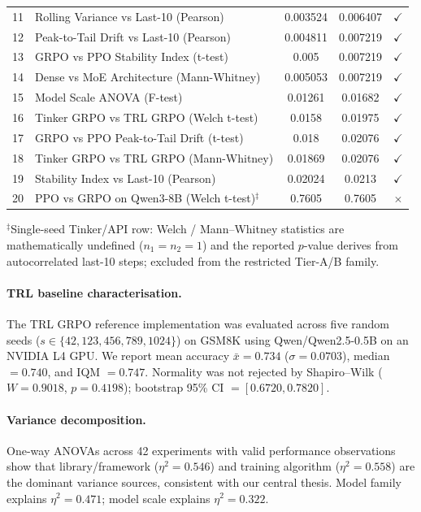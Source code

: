 \documentclass{article}
\begin{document}
\begin{table}[!ht]
\begin{tabular}{@{}rp{6.2cm}ccc@{}}
        11 & Rolling Variance vs Last-10 (Pearson) & 0.003524 & 0.006407 & $\checkmark$ \\
        12 & Peak-to-Tail Drift vs Last-10 (Pearson) & 0.004811 & 0.007219 & $\checkmark$ \\
        13 & GRPO vs PPO Stability Index (t-test) & 0.005 & 0.007219 & $\checkmark$ \\
        14 & Dense vs MoE Architecture (Mann-Whitney) & 0.005053 & 0.007219 & $\checkmark$ \\
        15 & Model Scale ANOVA (F-test) & 0.01261 & 0.01682 & $\checkmark$ \\
        16 & Tinker GRPO vs TRL GRPO (Welch t-test) & 0.0158 & 0.01975 & $\checkmark$ \\
        17 & GRPO vs PPO Peak-to-Tail Drift (t-test) & 0.018 & 0.02076 & $\checkmark$ \\
        18 & Tinker GRPO vs TRL GRPO (Mann-Whitney) & 0.01869 & 0.02076 & $\checkmark$ \\
        19 & Stability Index vs Last-10 (Pearson) & 0.02024 & 0.0213 & $\checkmark$ \\
        20 & PPO vs GRPO on Qwen3-8B (Welch t-test)$^{\ddag}$ & 0.7605 & 0.7605 & $\times$ \\
\bottomrule
\end{tabular}

\vspace{2pt}
{\scriptsize $^{\ddag}$Single-seed Tinker/API row: Welch / Mann--Whitney
statistics are mathematically undefined ($n_1{=}n_2{=}1$) and the
reported $p$-value derives from autocorrelated last-10 steps; excluded
from the restricted Tier-A/B family.}
\end{table}

\paragraph{TRL baseline characterisation.}
The TRL GRPO reference implementation was evaluated across five random seeds
($s \in \{42, 123, 456, 789, 1024\}$) on GSM8K using Qwen/Qwen2.5-0.5B on
an NVIDIA L4 GPU. We report mean accuracy $\bar{x} = 0.734$ ($\sigma = 0.0703$),
median $= 0.740$, and IQM $= 0.747$. Normality was not rejected by Shapiro--Wilk
($W = 0.9018$, $p = 0.4198$); bootstrap 95\% CI $= [0.6720, 0.7820]$.

\paragraph{Variance decomposition.}
One-way ANOVAs across 42 experiments with valid performance observations show
that library/framework ($\eta^2 = 0.546$) and training algorithm ($\eta^2 = 0.558$)
are the dominant variance sources, consistent with our central thesis. Model
family explains $\eta^2 = 0.471$; model scale explains $\eta^2 = 0.322$.
\end{document}
